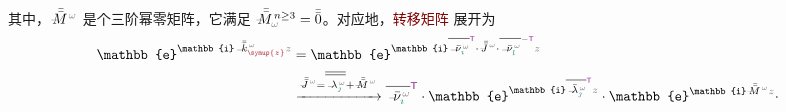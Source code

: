 其中，$\xint{\mathcolor{gray}{-}}{18}{\bar{\bar{M}}}^{\;\!\mathcolor{gray}{\omega}}$ 是个三阶\textcolor{PineGreen}{幂零矩阵}，它满足 $\xint{\mathcolor{gray}{-}}{18}{\bar{\bar{M}}}_{\mathcolor{gray}{\omega}}^{\;\! n \geq 3} = \bar{\bar{0}}$。对应地，\textcolor{Maroon}{转移矩阵} 展开为
\begin{subequations}
\begin{align}
	\mathbb{e}^{\mathbb{i} \xint{\begin{smallmatrix} ~ \\ {}^{}_{\mathcolor{gray}{-}} \\ ~ \end{smallmatrix}}{15}{\bar{\bar{k}}}_{\textcolor{Maroon}{\symup{z}}}^{\;\! \mathcolor{gray}{\omega}} \mathcolor{gray}{z}} &= \mathbb{e}^{\mathbb{i} \overline{\xint{\begin{smallmatrix} ~ \\ {}^{}_{\mathcolor{gray}{-}} \\ ~ \end{smallmatrix}}{15}{\bar{\nu}}^{\;\!\mathcolor{gray}{\omega}}_{\textcolor{PineGreen}{\imath}}}^{\mathsf{\textcolor{Plum}{T}}} \cdot \xint{\mathcolor{gray}{-}}{25}{\bar{\bar{J}}}^{\;\!\mathcolor{gray}{\omega}} \cdot \overline{\xint{\begin{smallmatrix} ~ \\ {}^{}_{\mathcolor{gray}{-}} \\ ~ \end{smallmatrix}}{15}{\bar{\nu}}^{\;\!\mathcolor{gray}{\omega}}_{\textcolor{PineGreen}{l}}}^{-{\mathsf{\textcolor{Plum}{T}}}} \mathcolor{gray}{z}} \label{eq:e^ikzz-Jordan_decompose} \\ &\xrightarrow[]{\xint{\mathcolor{gray}{-}}{25}{\bar{\bar{J}}}^{\;\!\mathcolor{gray}{\omega}} = \overline{\overline{\xint{\begin{smallmatrix} ~ \\ {}^{}_{\mathcolor{gray}{-}} \\ ~ \end{smallmatrix}}{22}{\lambda}^{\;\!\mathcolor{gray}{\omega}}_{\textcolor{PineGreen}{\jmath}}}} + \xint{\mathcolor{gray}{-}}{18}{\bar{\bar{M}}}^{\;\!\mathcolor{gray}{\omega}}} \overline{\xint{\begin{smallmatrix} ~ \\ {}^{}_{\mathcolor{gray}{-}} \\ ~ \end{smallmatrix}}{15}{\bar{\nu}}^{\;\!\mathcolor{gray}{\omega}}_{\textcolor{PineGreen}{\imath}}}^{{\mathsf{\textcolor{Plum}{T}}}} \cdot \mathbb{e}^{\mathbb{i} \overline{\xint{\begin{smallmatrix} ~ \\ {}^{}_{\mathcolor{gray}{-}} \\ ~ \end{smallmatrix}}{22}{\bar{\lambda}}^{\;\!\mathcolor{gray}{\omega}}_{\textcolor{PineGreen}{\jmath}}}^{{\mathsf{\textcolor{Plum}{T}}}} \mathcolor{gray}{z}} \cdot \mathbb{e}^{\mathbb{i} \xint{\mathcolor{gray}{-}}{18}{\bar{\bar{M}}}^{\;\!\mathcolor{gray}{\omega}} \mathcolor{gray}{z}} \cdot 
\end{align}
\end{subequations}
